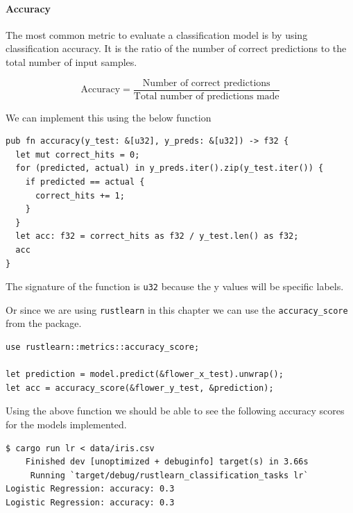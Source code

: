 \documentclass{book}
\begin{document}
\paragraph{Accuracy}%
The most common metric to evaluate a classification model is by using classification accuracy. It is the ratio of the number of correct predictions to the total number of input samples.

\begin{equation}
	\text{Accuracy} = \frac{\text{Number of correct predictions}}{\text{Total number of predictions made}}
\end{equation}

We can implement this using the below function

\begin{lstlisting}[caption={ml\\-utils\\/src\\/sup\_metrics\\.rs}]
pub fn accuracy(y_test: &[u32], y_preds: &[u32]) -> f32 {
  let mut correct_hits = 0;
  for (predicted, actual) in y_preds.iter().zip(y_test.iter()) {
    if predicted == actual {
      correct_hits += 1;
    }
  }
  let acc: f32 = correct_hits as f32 / y_test.len() as f32;
  acc
}
\end{lstlisting}

The signature of the function is \lstinline{u32} because the y values will be specific labels.

Or since we are using \lstinline{rustlearn} in this chapter we can use the \lstinline{accuracy_score} from the package.

\begin{lstlisting}[caption={chapter3\\/rustlearn\_classification\_tasks\\/src\\/logistic\_reg\\.rs}]
use rustlearn::metrics::accuracy_score;

let prediction = model.predict(&flower_x_test).unwrap();
let acc = accuracy_score(&flower_y_test, &prediction);
\end{lstlisting}

Using the above function we should be able to see the following accuracy scores for the models implemented.

\begin{lstlisting}[caption={chapter3\\/rustlearn\_classification\_tasks\\/src\\/logistic\_reg\\.rs}]
$ cargo run lr < data/iris.csv
    Finished dev [unoptimized + debuginfo] target(s) in 3.66s
     Running `target/debug/rustlearn_classification_tasks lr`
Logistic Regression: accuracy: 0.3
Logistic Regression: accuracy: 0.3
\end{lstlisting}
\end{document}
